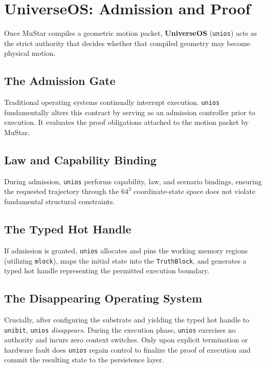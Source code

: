 \chapter{UniverseOS: Admission and Proof}

Once MuStar compiles a geometric motion packet, \textbf{UniverseOS} (\texttt{unios}) acts as the strict authority that decides whether that compiled geometry may become physical motion.

\section{The Admission Gate}

Traditional operating systems continually interrupt execution. \texttt{unios} fundamentally alters this contract by serving as an admission controller prior to execution. It evaluates the proof obligations attached to the motion packet by MuStar.

\section{Law and Capability Binding}

During admission, \texttt{unios} performs capability, law, and scenario bindings, ensuring the requested trajectory through the $64^3$ coordinate-state space does not violate fundamental structural constraints.

\section{The Typed Hot Handle}

If admission is granted, \texttt{unios} allocates and pins the working memory regions (utilizing \texttt{mlock}), maps the initial state into the \texttt{TruthBlock}, and generates a typed hot handle representing the permitted execution boundary.

\section{The Disappearing Operating System}

Crucially, after configuring the substrate and yielding the typed hot handle to \texttt{unibit}, \texttt{unios} \textit{disappears}. During the execution phase, \texttt{unios} exercises no authority and incurs zero context switches. Only upon explicit termination or hardware fault does \texttt{unios} regain control to finalize the proof of execution and commit the resulting state to the persistence layer.
